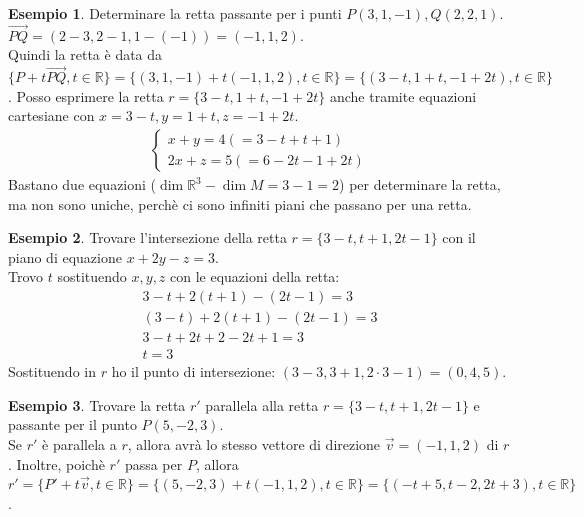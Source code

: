 \documentclass[a4paper]{article}
\theoremstyle{definition}
\newtheorem*{es}{Esempio}
\begin{document}
	\begin{es}
		Determinare la retta passante per i punti $P(3, 1, -1), Q(2, 2, 1)$. \\
		$\overrightarrow{PQ} = (2 - 3, 2 - 1, 1 - (- 1)) = (-1, 1, 2)$. \\
		Quindi la retta è data da $\{P + t \overrightarrow{PQ}, t \in \mathbb{R}\} = \{(3, 1, -1) + t(-1, 1, 2), t \in \mathbb{R}\}
		= \{(3 - t, 1 + t, -1 + 2t), t \in \mathbb{R}\}$.
		Posso esprimere la retta $r = \{3 - t, 1 + t, -1 + 2t\}$ anche tramite equazioni cartesiane con $x = 3 - t, y = 1 + t, z = -1 + 2t$.
		\begin{align*}
			\begin{cases}
				x + y = 4 (= 3 - t + t + 1)\\
				2x + z = 5 (= 6 - 2t - 1 + 2t)
			\end{cases}
		\end{align*}
		Bastano due equazioni ($\dim \mathbb{R}^3 - \dim M = 3 - 1 = 2$) per determinare la retta, ma non sono uniche, perchè
		ci sono infiniti piani che passano per una retta.
	\end{es}

	\begin{es}
		Trovare l'intersezione della retta $r = \{3  -t, t + 1, 2t - 1\}$ con il piano di equazione $x + 2y - z = 3$. \\
		Trovo $t$ sostituendo $x, y, z$ con le equazioni della retta:
		\begin{align*}
			3 - t + 2(t + 1) - (2t - 1) = 3 \\
			(3 - t) + 2(t + 1) - (2t - 1) = 3 \\
			3 - t + 2t + 2 - 2t + 1 = 3 \\
			t = 3
		\end{align*}
		Sostituendo in $r$ ho il punto di intersezione: $(3 - 3, 3 + 1, 2 \cdot 3 - 1) = (0, 4, 5)$.
	\end{es}

	\begin{es}
		Trovare la retta $r'$ parallela alla retta $r = \{3 - t, t + 1, 2t - 1\}$ e passante per il punto $P(5, -2, 3)$. \\
		Se $r'$ è parallela a $r$, allora avrà lo stesso vettore di direzione $\overrightarrow{v} = (-1, 1, 2)$ di $r$.
		Inoltre, poichè $r'$ passa per $P$, allora $r' = \{P' + t \overrightarrow{v}, t \in \mathbb{R}\}
		= \{(5, -2, 3) + t(-1, 1, 2), t \in \mathbb{R}\} = \{(-t + 5, t - 2, 2t + 3), t \in \mathbb{R}\}$.
	\end{es}
\end{document}
